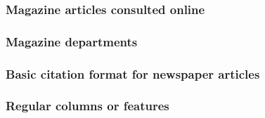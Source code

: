 \documentclass[11pt,letterpaper,oneside]{article}
\begin{document}
\begin{citebib}
\item \cite[48]{saulnier2008}
\item \cite[59]{lepore2015}
\end{citebib}

\subsubsection{Magazine articles consulted online}

\begin{citebib}
\item \cite{vick2015}
\item \cite[5]{hanemann1926}
\end{citebib}

\subsubsection{Magazine departments}

\begin{citebib}
\item \cite{marx2015}
\item \cite{wallraff2008}
\item \cite{gourmet2000}
\end{citebib}

\subsubsection{Basic citation format for newspaper articles}

\begin{citebib}
\item \cite{editorial1990}
\item \cite{royko1992}
\item \cite{forester2000}
\item \cite{samenow2016}
\end{citebib}

\setcounter{subsubsection}{194}
\subsubsection{Regular columns or features}

\begin{citebib}
\item \cite{jaffe2015}
\item \cite{editorial2015}
\end{citebib}
\end{document}
